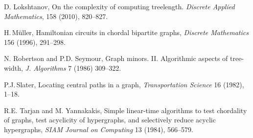 \documentclass[10pt]{llncs}
\begin{document}
\begin{thebibliography}{99}
    D. Lokshtanov,
    On the complexity of computing treelength.
    \emph{Discrete Applied Mathematics}, 158 (2010), 820--827.

    H.\,Müller,
    Hamiltonian circuits in chordal bipartite graphs,
    \emph{Discrete Mathematics} 156 (1996), 291--298.

    N. Robertson and P.D. Seymour,
    Graph minors. II. Algorithmic aspects of tree-width,
    \emph{J. Algorithms} 7 (1986) 309--322.

    P.J.\,Slater,
   Locating central paths in a graph,
    \emph{Transportation Science} 16 (1982), 1--18.

    R.E. Tarjan and M. Yannakakis,
    Simple linear-time algorithms to test chordality of graphs, test acyclicity of hypergraphs, and selectively reduce acyclic hypergraphs,
    \emph{SIAM Journal on Computing} 13 (1984), 566--579.

\end{thebibliography}
\end{document}
